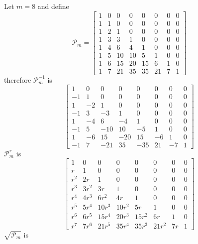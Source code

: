 Let $m=8$ and define
\begin{displaymath}
\mathcal{P}_{m}=\left[\begin{matrix}1 & 0 & 0 & 0 & 0 & 0 & 0 & 0\\1 & 1 & 0 & 0 & 0 & 0 & 0 & 0\\1 & 2 & 1 & 0 & 0 & 0 & 0 & 0\\1 & 3 & 3 & 1 & 0 & 0 & 0 & 0\\1 & 4 & 6 & 4 & 1 & 0 & 0 & 0\\1 & 5 & 10 & 10 & 5 & 1 & 0 & 0\\1 & 6 & 15 & 20 & 15 & 6 & 1 & 0\\1 & 7 & 21 & 35 & 35 & 21 & 7 & 1\end{matrix}\right]
\end{displaymath}
therefore $\mathcal{P}_{m}^{-1}$ is
\begin{displaymath}
\left[\begin{matrix}1 & 0 & 0 & 0 & 0 & 0 & 0 & 0\\-1 & 1 & 0 & 0 & 0 & 0 & 0 & 0\\1 & -2 & 1 & 0 & 0 & 0 & 0 & 0\\-1 & 3 & -3 & 1 & 0 & 0 & 0 & 0\\1 & -4 & 6 & -4 & 1 & 0 & 0 & 0\\-1 & 5 & -10 & 10 & -5 & 1 & 0 & 0\\1 & -6 & 15 & -20 & 15 & -6 & 1 & 0\\-1 & 7 & -21 & 35 & -35 & 21 & -7 & 1\end{matrix}\right]
\end{displaymath}
$\mathcal{P}_{m}^{r}$ is
\begin{displaymath}
\left[\begin{matrix}1 & 0 & 0 & 0 & 0 & 0 & 0 & 0\\r & 1 & 0 & 0 & 0 & 0 & 0 & 0\\r^{2} & 2 r & 1 & 0 & 0 & 0 & 0 & 0\\r^{3} & 3 r^{2} & 3 r & 1 & 0 & 0 & 0 & 0\\r^{4} & 4 r^{3} & 6 r^{2} & 4 r & 1 & 0 & 0 & 0\\r^{5} & 5 r^{4} & 10 r^{3} & 10 r^{2} & 5 r & 1 & 0 & 0\\r^{6} & 6 r^{5} & 15 r^{4} & 20 r^{3} & 15 r^{2} & 6 r & 1 & 0\\r^{7} & 7 r^{6} & 21 r^{5} & 35 r^{4} & 35 r^{3} & 21 r^{2} & 7 r & 1\end{matrix}\right]
\end{displaymath}
$\sqrt{\mathcal{P}_{m}}$ is
